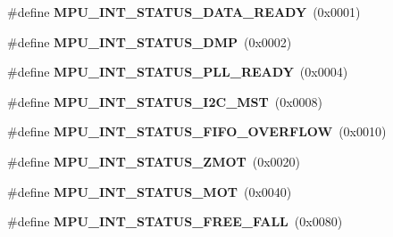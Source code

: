 \begin{DoxyCompactItemize}
\item 
\#define {\bfseries M\+P\+U\+\_\+\+I\+N\+T\+\_\+\+S\+T\+A\+T\+U\+S\+\_\+\+D\+A\+T\+A\+\_\+\+R\+E\+A\+DY}~(0x0001)\hypertarget{group___d_r_i_v_e_r_s_ga0cddf0dffaf3bf65fd3ed92dda4f3193}{}\label{group___d_r_i_v_e_r_s_ga0cddf0dffaf3bf65fd3ed92dda4f3193}

\item 
\#define {\bfseries M\+P\+U\+\_\+\+I\+N\+T\+\_\+\+S\+T\+A\+T\+U\+S\+\_\+\+D\+MP}~(0x0002)\hypertarget{group___d_r_i_v_e_r_s_ga380dd1ef256931e99302c371ad7752f4}{}\label{group___d_r_i_v_e_r_s_ga380dd1ef256931e99302c371ad7752f4}

\item 
\#define {\bfseries M\+P\+U\+\_\+\+I\+N\+T\+\_\+\+S\+T\+A\+T\+U\+S\+\_\+\+P\+L\+L\+\_\+\+R\+E\+A\+DY}~(0x0004)\hypertarget{group___d_r_i_v_e_r_s_gaa38d7976e86186bf353cb89ca7561f29}{}\label{group___d_r_i_v_e_r_s_gaa38d7976e86186bf353cb89ca7561f29}

\item 
\#define {\bfseries M\+P\+U\+\_\+\+I\+N\+T\+\_\+\+S\+T\+A\+T\+U\+S\+\_\+\+I2\+C\+\_\+\+M\+ST}~(0x0008)\hypertarget{group___d_r_i_v_e_r_s_ga5755e84f3a2e7d331f7612dbfea18ecc}{}\label{group___d_r_i_v_e_r_s_ga5755e84f3a2e7d331f7612dbfea18ecc}

\item 
\#define {\bfseries M\+P\+U\+\_\+\+I\+N\+T\+\_\+\+S\+T\+A\+T\+U\+S\+\_\+\+F\+I\+F\+O\+\_\+\+O\+V\+E\+R\+F\+L\+OW}~(0x0010)\hypertarget{group___d_r_i_v_e_r_s_gaf8e1684698ad837d0318a72b1ef73b13}{}\label{group___d_r_i_v_e_r_s_gaf8e1684698ad837d0318a72b1ef73b13}

\item 
\#define {\bfseries M\+P\+U\+\_\+\+I\+N\+T\+\_\+\+S\+T\+A\+T\+U\+S\+\_\+\+Z\+M\+OT}~(0x0020)\hypertarget{group___d_r_i_v_e_r_s_gad5eee7ff393f842ca4ae969cc0019030}{}\label{group___d_r_i_v_e_r_s_gad5eee7ff393f842ca4ae969cc0019030}

\item 
\#define {\bfseries M\+P\+U\+\_\+\+I\+N\+T\+\_\+\+S\+T\+A\+T\+U\+S\+\_\+\+M\+OT}~(0x0040)\hypertarget{group___d_r_i_v_e_r_s_gaa1ab51fb5995e568edd425f8486cb2c8}{}\label{group___d_r_i_v_e_r_s_gaa1ab51fb5995e568edd425f8486cb2c8}

\item 
\#define {\bfseries M\+P\+U\+\_\+\+I\+N\+T\+\_\+\+S\+T\+A\+T\+U\+S\+\_\+\+F\+R\+E\+E\+\_\+\+F\+A\+LL}~(0x0080)\hypertarget{group___d_r_i_v_e_r_s_ga000cfa5230cb895c6bad322856465552}{}\label{group___d_r_i_v_e_r_s_ga000cfa5230cb895c6bad322856465552}


\end{DoxyCompactItemize}

